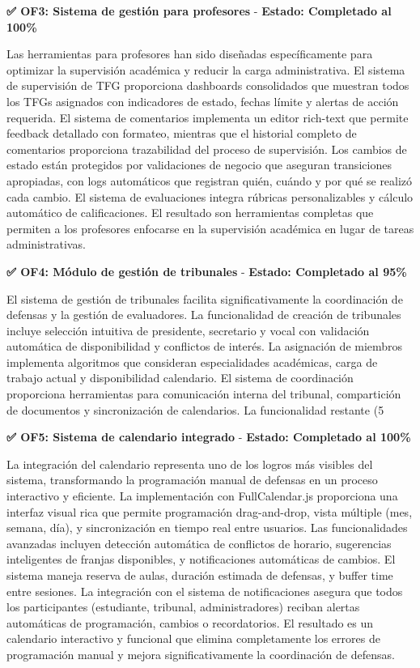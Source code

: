 \documentclass[12pt,a4paper,oneside]{report}
\begin{document}
\textbf{✅ OF3: Sistema de gestión para profesores} - \textbf{Estado: Completado al 100\%}

Las herramientas para profesores han sido diseñadas específicamente para optimizar la supervisión académica y reducir la carga administrativa. El sistema de supervisión de TFG proporciona dashboards consolidados que muestran todos los TFGs asignados con indicadores de estado, fechas límite y alertas de acción requerida. El sistema de comentarios implementa un editor rich-text que permite feedback detallado con formateo, mientras que el historial completo de comentarios proporciona trazabilidad del proceso de supervisión. Los cambios de estado están protegidos por validaciones de negocio que aseguran transiciones apropiadas, con logs automáticos que registran quién, cuándo y por qué se realizó cada cambio. El sistema de evaluaciones integra rúbricas personalizables y cálculo automático de calificaciones. El resultado son herramientas completas que permiten a los profesores enfocarse en la supervisión académica en lugar de tareas administrativas.

\textbf{✅ OF4: Módulo de gestión de tribunales} - \textbf{Estado: Completado al 95\%}

El sistema de gestión de tribunales facilita significativamente la coordinación de defensas y la gestión de evaluadores. La funcionalidad de creación de tribunales incluye selección intuitiva de presidente, secretario y vocal con validación automática de disponibilidad y conflictos de interés. La asignación de miembros implementa algoritmos que consideran especialidades académicas, carga de trabajo actual y disponibilidad calendario. El sistema de coordinación proporciona herramientas para comunicación interna del tribunal, compartición de documentos y sincronización de calendarios. La funcionalidad restante (5%

\textbf{✅ OF5: Sistema de calendario integrado} - \textbf{Estado: Completado al 100\%}

La integración del calendario representa uno de los logros más visibles del sistema, transformando la programación manual de defensas en un proceso interactivo y eficiente. La implementación con FullCalendar.js proporciona una interfaz visual rica que permite programación drag-and-drop, vista múltiple (mes, semana, día), y sincronización en tiempo real entre usuarios. Las funcionalidades avanzadas incluyen detección automática de conflictos de horario, sugerencias inteligentes de franjas disponibles, y notificaciones automáticas de cambios. El sistema maneja reserva de aulas, duración estimada de defensas, y buffer time entre sesiones. La integración con el sistema de notificaciones asegura que todos los participantes (estudiante, tribunal, administradores) reciban alertas automáticas de programación, cambios o recordatorios. El resultado es un calendario interactivo y funcional que elimina completamente los errores de programación manual y mejora significativamente la coordinación de defensas.
\end{document}
